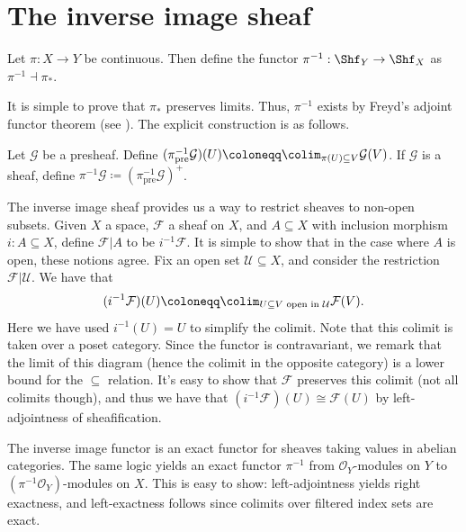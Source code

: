\section{The inverse image sheaf}

\begin{definition}\label{dfn:2-7-1}
	Let $\pi : X \to Y$ be continuous. Then define the functor $\pi ^{-1} : \Shf _Y \to \Shf _X$ as $\pi ^{-1} \dashv \pi _*$.
\end{definition}

It is simple to prove that $\pi _*$ preserves limits. Thus, $\pi ^{-1} $ exists by Freyd's adjoint functor theorem (see \cite{ml}). The explicit construction is as follows.

\begin{construction}
	Let $\mathcal{G} $ be a presheaf. Define $(\pi ^{-1} _{\mathrm{pre} } \mathcal{G})(U) \coloneqq \colim_{\pi (U) \subseteq V} \mathcal{G} (V)$. If $\mathcal{G} $ is a sheaf, define $\pi ^{-1} \mathcal{G}\coloneqq (\pi _{\mathrm{pre} } ^{-1} \mathcal{G} )^+$.
\end{construction}

The inverse image sheaf provides us a way to restrict sheaves to non-open subsets. Given $X$ a space, $\mathcal{F} $ a sheaf on $X$, and $A\subseteq X$ with inclusion morphism $i : A \subseteq X$, define $\mathcal{F} |A$ to be $i^{-1} \mathcal{F} $. It is simple to show that in the case where $A$ is open, these notions agree. Fix an open set $\mathcal{U} \subseteq X$, and consider the restriction $\mathcal{F} |\mathcal{U} $. We have that
\[
	(i^{-1} \mathcal{F} )(U) \coloneqq \colim_{U \subseteq V \text{ open in } \mathcal{U}} \mathcal{F} (V)
.\]
Here we have used $i^{-1} (U)=U$ to simplify the colimit. Note that this colimit is taken over a poset category. Since the functor is contravariant, we remark that the limit of this diagram (hence the colimit in the opposite category) is a lower bound for the $\subseteq $ relation. It's easy to show that $\mathcal{F} $ preserves this colimit (not all colimits though), and thus we have that $(i^{-1} \mathcal{F})(U)\cong \mathcal{F} (U)$ by left-adjointness of sheafification.

\begin{remark}
	The inverse image functor is an exact functor for sheaves taking values in abelian categories. The same logic yields an exact functor $\pi ^{-1}$ from $\mathcal{O} _Y$-modules on $Y$ to $(\pi^{-1} \mathcal{O}_Y)$-modules on $X$. This is easy to show: left-adjointness yields right exactness, and left-exactness follows since colimits over filtered index sets are exact.
\end{remark}




